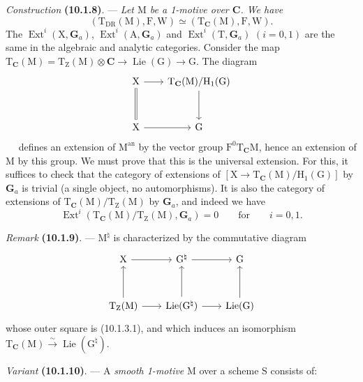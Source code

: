 \documentclass[11pt,leqno]{article}
\newcommand{\Page}[1]{\ifvmode\noindent\else\unskip\ \fi{\footnotesize\textcolor{gray}{[p.\,#1]}}\ \ignorespaces}
\begin{document}
\textit{Construction} \textbf{(10.1.8)}. —
\textit{Let \(\mathrm{M}\) be a 1-motive over \(\mathbf{C}\). We have}
\[
(\mathrm{T}_{\mathrm{DR}}(\mathrm{M}),\mathrm{F},\mathrm{W})
\simeq
(\mathrm{T}_{\mathbf{C}}(\mathrm{M}),\mathrm{F},\mathrm{W}).
\]
The \(\operatorname{Ext}^i(\mathrm{X},\mathbf{G}_a)\),
\(\operatorname{Ext}^i(\mathrm{A},\mathbf{G}_a)\) and
\(\operatorname{Ext}^i(\mathrm{T},\mathbf{G}_a)\) \((i=0,1)\)
are the same in the algebraic and analytic categories.
Consider the map
\(\mathrm{T}_{\mathbf{C}}(\mathrm{M})
=\mathrm{T}_{\mathrm{Z}}(\mathrm{M})\otimes\mathbf{C}
\to\operatorname{Lie}(\mathrm{G})\to\mathrm{G}\).
The diagram
\[
\begin{tikzcd}[column sep=2em, row sep=3em]
\mathrm{X} \arrow[r] \arrow[d, equal]
&
\mathrm{T}_{\mathbf{C}}(\mathrm{M})/\mathrm{H}_1(\mathrm{G})
  \arrow[d]
\\
\mathrm{X} \arrow[r]
&
\mathrm{G}
\end{tikzcd}
\]
\Page{59}
defines an extension of \(\mathrm{M}^{\mathrm{an}}\) by the vector
group \(\mathrm{F}^0\mathrm{T}_{\mathbf{C}}\mathrm{M}\), hence an
extension of \(\mathrm{M}\) by this group. We must prove that
this is the universal extension. For this, it suffices to check that
the category of extensions of
\([\mathrm{X}\to\mathrm{T}_{\mathbf{C}}(\mathrm{M})/\mathrm{H}_1(\mathrm{G})]\)
by \(\mathbf{G}_a\) is trivial (a single object, no automorphisms).
It is also the category of extensions of
\(\mathrm{T}_{\mathbf{C}}(\mathrm{M})/\mathrm{T}_{\mathrm{Z}}(\mathrm{M})\)
by \(\mathbf{G}_a\), and indeed we have
\[
\operatorname{Ext}^i
(\mathrm{T}_{\mathbf{C}}(\mathrm{M})/\mathrm{T}_{\mathrm{Z}}(\mathrm{M}),
\mathbf{G}_a)=0
\qquad\text{for}\qquad i=0,1.
\]

\textit{Remark} \textbf{(10.1.9)}. —
\(\mathrm{M}^{\natural}\) is characterized by the commutative diagram
\[
\begin{tikzcd}[column sep=2em, row sep=3.2em]
\mathrm{X} \arrow[r]
&
\mathrm{G}^{\natural} \arrow[r]
&
\mathrm{G}
\\
\mathrm{T}_{\mathrm{Z}}(\mathrm{M}) \arrow[r] \arrow[u]
&
\operatorname{Lie}(\mathrm{G}^{\natural}) \arrow[r] \arrow[u]
&
\operatorname{Lie}(\mathrm{G}) \arrow[u]
\end{tikzcd}
\]
whose outer square is (10.1.3.1), and which induces an isomorphism
\(\mathrm{T}_{\mathbf{C}}(\mathrm{M})
\xrightarrow{\sim}\operatorname{Lie}(\mathrm{G}^{\natural})\).

\textit{Variant} \textbf{(10.1.10)}. —
A \textit{smooth 1-motive} \(\mathrm{M}\) over a scheme \(\mathrm{S}\)
consists of:
\end{document}
